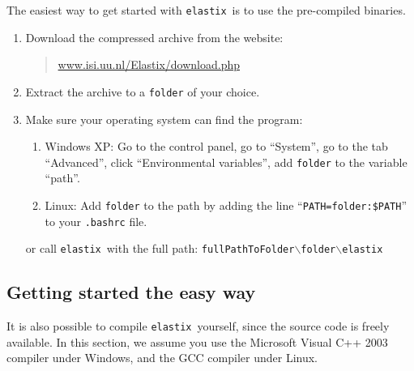 \documentclass[]{report}
\newcommand{\elastix}{\texttt{elastix}}
\begin{document}
The easiest way to get started with \elastix\ is to use the
pre-compiled binaries.
\begin{enumerate}
\item Download the compressed archive from the website:
    \begin{quote}
    \url{www.isi.uu.nl/Elastix/download.php}
    \end{quote}

\item Extract the archive to a \texttt{folder} of your choice.

\item Make sure your operating system can find the program:
    \begin{enumerate}
    \item Windows XP: Go to the control panel, go to ``System'', go to
    the tab ``Advanced'', click ``Environmental variables'', add \texttt{folder}
    to the variable ``path''.

    \item Linux: Add \texttt{folder} to the path by adding the line
    ``\texttt{PATH=folder:\$PATH}'' to your \texttt{.bashrc} file.
    \end{enumerate}
    or call \elastix\ with the full path:
    \texttt{fullPathToFolder$\backslash$folder$\backslash$elastix}
\end{enumerate}

\subsection{Getting started the easy way}

It is also possible to compile \elastix\ yourself, since the source
code is freely available. In this section, we assume you use the
Microsoft Visual C++ 2003 compiler under Windows, and the GCC
compiler under Linux.
\end{document}
